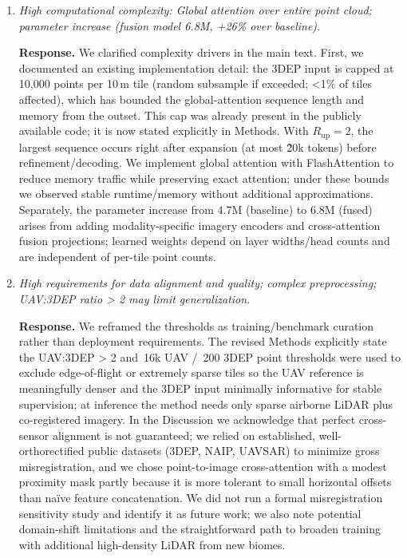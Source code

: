 \documentclass[11pt]{article}
\newcommand{\response}{\textbf{Response.} }
\begin{document}
\begin{enumerate}
  \item \emph{High computational complexity: Global attention over entire point cloud; parameter increase (fusion model 6.8M, +26\% over baseline).}

  \response We clarified complexity drivers in the main text. First, we documented an existing implementation detail: the 3DEP input is capped at 10,000 points per 10\,m tile (random subsample if exceeded; <1\% of tiles affected), which has bounded the global-attention sequence length and memory from the outset. This cap was already present in the publicly available code; it is now stated explicitly in Methods. With $R_{\text{up}}{=}2$, the largest sequence occurs right after expansion (at most \~20k tokens) before refinement/decoding. We implement global attention with FlashAttention to reduce memory traffic while preserving exact attention; under these bounds we observed stable runtime/memory without additional approximations. Separately, the parameter increase from 4.7M (baseline) to 6.8M (fused) arises from adding modality-specific imagery encoders and cross-attention fusion projections; learned weights depend on layer widths/head counts and are independent of per-tile point counts.

  \item \emph{High requirements for data alignment and quality; complex preprocessing; UAV:3DEP ratio > 2 may limit generalization.}

  \response We reframed the thresholds as training/benchmark curation rather than deployment requirements. The revised Methods explicitly state the UAV:3DEP > 2 and \geq\,16k UAV / \geq\,200 3DEP point thresholds were used to exclude edge-of-flight or extremely sparse tiles so the UAV reference is meaningfully denser and the 3DEP input minimally informative for stable supervision; at inference the method needs only sparse airborne LiDAR plus co-registered imagery. In the Discussion we acknowledge that perfect cross-sensor alignment is not guaranteed; we relied on established, well-orthorectified public datasets (3DEP, NAIP, UAVSAR) to minimize gross misregistration, and we chose point-to-image cross-attention with a modest proximity mask partly because it is more tolerant to small horizontal offsets than naïve feature concatenation. We did not run a formal misregistration sensitivity study and identify it as future work; we also note potential domain-shift limitations and the straightforward path to broaden training with additional high-density LiDAR from new biomes.
\end{enumerate}
\end{document}
